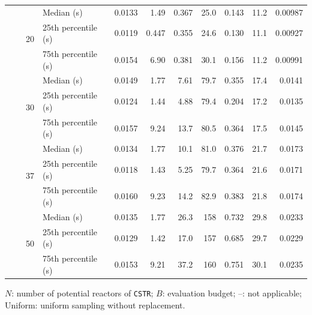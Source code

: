 \begin{table}[p]
\begin{threeparttable}
\begin{tabular}{@{}lrrlrrrrrrr@{}}
 &  & \multirow{3}{*}{20} & Median (s) & 0.0133 & 1.49 & 0.367 & 25.0 & 0.143 & 11.2 & 0.00987 \\
 & &  & 25th percentile (s) & 0.0119 & 0.447 & 0.355 & 24.6 & 0.130 & 11.1 & 0.00927 \\
 & &  & 75th percentile (s) & 0.0154 & 6.90 & 0.381 & 30.1 & 0.156 & 11.2 & 0.00991 \\
 &  & \multirow{3}{*}{30} & Median (s) & 0.0149 & 1.77 & 7.61 & 79.7 & 0.355 & 17.4 & 0.0141 \\
 & &  & 25th percentile (s) & 0.0124 & 1.44 & 4.88 & 79.4 & 0.204 & 17.2 & 0.0135 \\
 & &  & 75th percentile (s) & 0.0157 & 9.24 & 13.7 & 80.5 & 0.364 & 17.5 & 0.0145 \\
 &  & \multirow{3}{*}{37} & Median (s) & 0.0134 & 1.77 & 10.1 & 81.0 & 0.376 & 21.7 & 0.0173 \\
 & &  & 25th percentile (s) & 0.0118 & 1.43 & 5.25 & 79.7 & 0.364 & 21.6 & 0.0171 \\
 & &  & 75th percentile (s) & 0.0160 & 9.23 & 14.2 & 82.9 & 0.383 & 21.8 & 0.0174 \\
 &  & \multirow{3}{*}{50} & Median (s) & 0.0135 & 1.77 & 26.3 & 158 & 0.732 & 29.8 & 0.0233 \\
 & &  & 25th percentile (s) & 0.0129 & 1.42 & 17.0 & 157 & 0.685 & 29.7 & 0.0229 \\
 & &  & 75th percentile (s) & 0.0153 & 9.21 & 37.2 & 160 & 0.751 & 30.1 & 0.0235 \\
\bottomrule
\end{tabular}
\begin{tablenotes}[flushleft]\footnotesize
\item \(N\): number of potential reactors of \texttt{CSTR}; \(B\): evaluation budget; --: not applicable; Uniform: uniform sampling without replacement.
\end{tablenotes}
\end{threeparttable}
\end{table}

